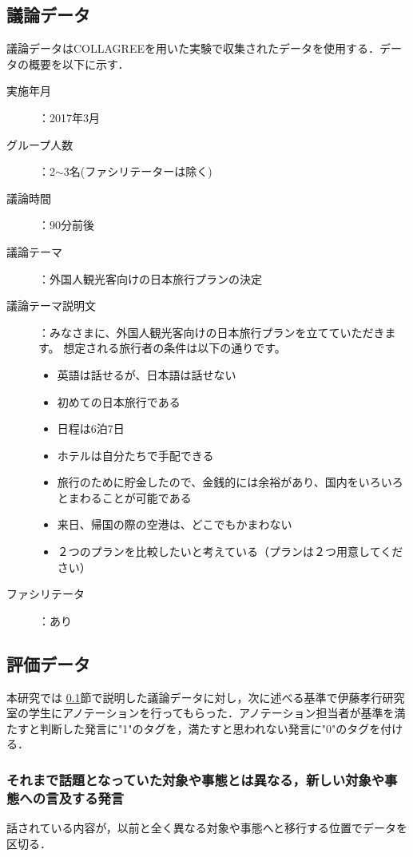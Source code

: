 \subsection{議論データ}
\label{exp:data:discussion}
議論データはCOLLAGREEを用いた実験で収集されたデータを使用する．データの概要を以下に示す．
\\
\begin{description}
\item [実施年月]：2017年3月
\item [グループ人数]：2$\sim$3名(ファシリテーターは除く)
\item [議論時間]：90分前後
\item [議論テーマ]：外国人観光客向けの日本旅行プランの決定
\item [議論テーマ説明文]：みなさまに、外国人観光客向けの日本旅行プランを立てていただきます。 想定される旅行者の条件は以下の通りです。
\begin{itemize}
\item 英語は話せるが、日本語は話せない
\item 初めての日本旅行である
\item 日程は6泊7日
\item ホテルは自分たちで手配できる
\item 旅行のために貯金したので、金銭的には余裕があり、国内をいろいろとまわることが可能である
\item 来日、帰国の際の空港は、どこでもかまわない
\item ２つのプランを比較したいと考えている（プランは２つ用意してください）
\end{itemize}
\item [ファシリテータ]：あり
\end{description}

\subsection{評価データ}
\label{exp:data:evaluation}
本研究では \ref{exp:data:discussion}節で説明した議論データに対し，次に述べる基準で伊藤孝行研究室の学生にアノテーションを行ってもらった．アノテーション担当者が基準を満たすと判断した発言に"1"のタグを，満たすと思われない発言に"0"のタグを付ける．
\subsubsection*{ それまで話題となっていた対象や事態とは異なる，新しい対象や事態への言及する発言}
話されている内容が，以前と全く異なる対象や事態へと移行する位置でデータを区切る．
